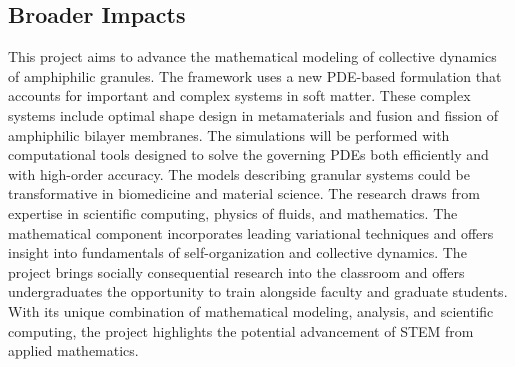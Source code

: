 \documentclass[10pt]{article}
\begin{document}
\subsection*{Broader Impacts}
\vspace{-0.1in}
This project aims to advance the mathematical modeling of collective
dynamics of amphiphilic granules. The framework uses a new PDE-based
formulation that accounts for important and complex systems in soft
matter. These complex systems include optimal shape design in
metamaterials and fusion and fission of amphiphilic bilayer membranes.
The simulations will be performed with computational tools designed to
solve the governing PDEs both efficiently and with high-order accuracy.
The models describing granular systems could be transformative in
biomedicine and material science. The research draws from expertise in
scientific computing, physics of fluids, and mathematics. The
mathematical component incorporates leading variational techniques and
offers insight into fundamentals of self-organization and collective
dynamics. The project brings socially consequential research into the
classroom and offers undergraduates the opportunity to train alongside
faculty and graduate students. With its unique combination of
mathematical modeling, analysis, and scientific computing, the project
highlights the potential advancement of STEM from applied mathematics.
\end{document}
